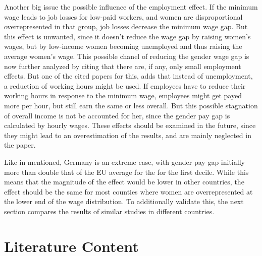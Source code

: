 \documentclass[12pt,draft,a4paper]{article}
\begin{document}
Another big issue the possible influence of the employment effect. 
If the minimum wage leads to job losses for low-paid workers, and women are disproportional overrepresented in that group, job losses decrease the minimum wage gap. But this effect is unwanted, since it doesn't reduce the wage gap by raising women's wages, but by low-income women becoming unemployed and thus raising the average women's wage. 
This possible chanel of reducing the gender wage gap is now further analyzed by \citet{CALIENDO22} citing that there are, if any, only small employment effects. But one of the cited papers for this, \citep{Caliendo2017short} adds that instead of unemployment, a reduction of working hours might be used.
If employees have to reduce their working hours in response to the minimum wage, employees might get payed more per hour, but still earn the same or less overall.
But this possible stagnation of overall income is not be accounted for her, since the gender pay gap is calculated by hourly wages.
These effects should be examined in the future, since they might lead to an overestimation of the results, and are mainly neglected in the paper.


Like in  mentioned, Germany is an extreme case, with gender pay gap initially more than double that of the EU average for the for the first decile. While this means that the magnitude of the effect would be lower in other countries, the effect should be the same for most counties where women are overrepresented at the lower end of the wage distribution. To additionally validate this, the next section compares the results of similar studies in different countries.


\section{Literature Content} %
\end{document}
